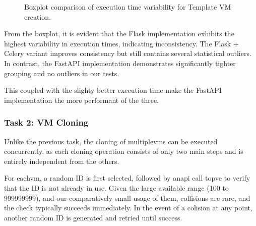 \begin{figure}[ht]
                \caption{Boxplot comparison of execution time variability for Template VM creation.}
                \label{fig:task1_boxplot}
            \end{figure}

            From the boxplot, it is evident that the Flask implementation exhibits the highest variability in execution 
            times, indicating inconsistency. The Flask + Celery variant improves consistency but still contains several 
            statistical outliers. In contrast, the FastAPI implementation demonstrates significantly tighter grouping and 
            no outliers in our tests.

            This coupled with the slighty better execution time make the FastAPI implementation the more performant of 
            the three.

        \subsubsection{Task 2: VM Cloning}            
            Unlike the previous task, the cloning of multiple\ac{vm}s can be executed concurrently, as each cloning operation 
            consists of only two main steps and is entirely independent from the others.

            For each\ac{vm}, a random ID is first selected, followed by an\ac{api} call to\ac{pve} to verify that the ID is not already 
            in use. Given the large available range (100 to 999999999), and our comparatively small usage of them, collisions are rare, 
            and the check typically succeeds immediately. In the event of a colision at any point, another random ID is generated and 
            retried until success.

